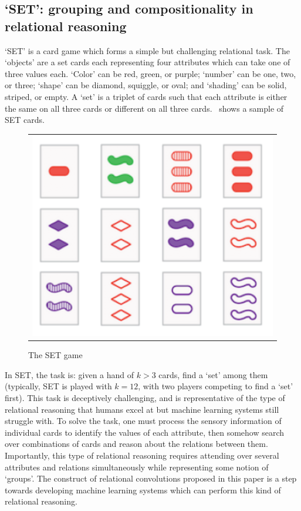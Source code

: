 \subsection{`SET': grouping and compositionality in relational reasoning}\label{ssec:experiments_set}

`SET' is a card game which forms a simple but challenging relational task. The `objects' are a set cards each representing four attributes which can take one of three values each. `Color' can be red, green, or purple; `number' can be one, two, or three; `shape' can be diamond, squiggle, or oval; and `shading' can be solid, striped, or empty. A `set' is a triplet of cards such that each attribute is either the same on all three cards or different on all three cards.~ shows a sample of SET cards.

\begin{figure}
	\vskip-5pt
	\begin{tabular}{c}
		\includegraphics[width=.25\textwidth]{figs/set_example}\\[-5pt]
	\end{tabular}
	\caption{\footnotesize The SET game}\label{fig:set_example}
\end{figure}
In SET, the task is: given a hand of $k > 3$ cards, find a `set' among them (typically, SET is played with $k=12$, with two players competing to find a `set' first). This task is deceptively challenging, and is representative of the type of relational reasoning that humans excel at but machine learning systems still struggle with. To solve the task, one must process the sensory information of individual cards to identify the values of each attribute, then somehow search over combinations of cards and reason about the relations between them. Importantly, this type of relational reasoning requires attending over several attributes and relations simultaneously while representing some notion of `groups'.  The construct of relational convolutions proposed in this paper is a step towards developing machine learning systems which can perform this kind of relational reasoning.


